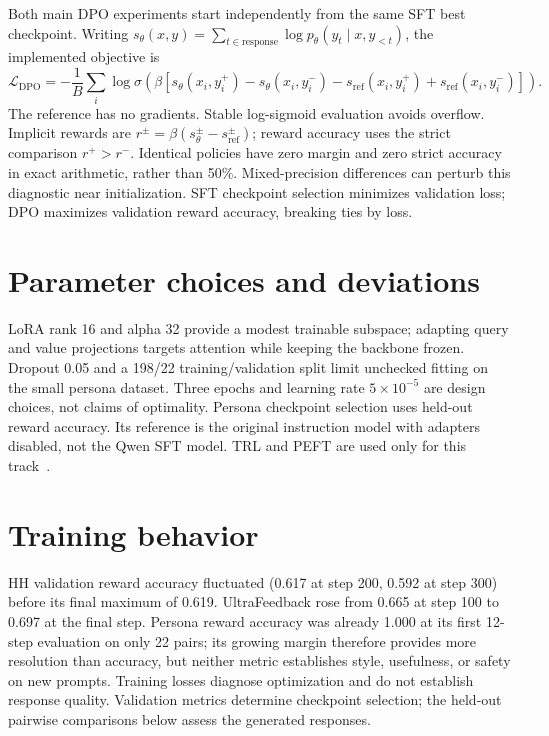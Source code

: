 \documentclass[11pt,a4paper]{article}
\begin{document}
Both main DPO experiments start independently from the same SFT best checkpoint.
Writing $s_\theta(x,y)=\sum_{t\in\mathrm{response}}\log p_\theta(y_t\mid x,y_{<t})$,
the implemented objective is
\begin{equation}
\mathcal L_{\mathrm{DPO}}=-\frac1B\sum_i\log\sigma\!\left(\beta\left[
s_\theta(x_i,y_i^+)-s_\theta(x_i,y_i^-)
-s_{\mathrm{ref}}(x_i,y_i^+)+s_{\mathrm{ref}}(x_i,y_i^-)\right]\right).
\end{equation}
The reference has no gradients. Stable log-sigmoid evaluation avoids overflow.
Implicit rewards are $r^\pm=\beta(s_\theta^\pm-s_{\mathrm{ref}}^\pm)$; reward accuracy
uses the strict comparison $r^+>r^-$. Identical policies have zero margin and zero
strict accuracy in exact arithmetic, rather than 50\%. Mixed-precision differences
can perturb this diagnostic near initialization. SFT checkpoint selection minimizes
validation loss; DPO maximizes validation reward accuracy, breaking ties by loss.

\section{Parameter choices and deviations}

LoRA rank 16 and alpha 32 provide a modest trainable subspace; adapting query and
value projections targets attention while keeping the backbone frozen. Dropout
0.05 and a 198/22 training/validation split limit unchecked fitting on the small
persona dataset. Three epochs and learning rate $5\times10^{-5}$ are design choices,
not claims of optimality. Persona checkpoint selection uses held-out reward
accuracy. Its reference is the original instruction model with adapters disabled,
not the Qwen SFT model. TRL and PEFT are used only for this track~\cite{trl,peft}.

\section{Training behavior}


HH validation reward accuracy fluctuated (0.617 at step 200, 0.592 at step
300) before its final maximum of 0.619. UltraFeedback rose from 0.665 at
step 100 to 0.697 at the final step. Persona reward accuracy was already
1.000 at its first 12-step evaluation on only 22 pairs; its growing margin
therefore provides more resolution than accuracy, but neither metric
establishes style, usefulness, or safety on new prompts.
Training losses diagnose optimization and do not establish response quality.
Validation metrics determine checkpoint selection; the held-out pairwise
comparisons below assess the generated responses.
\end{document}
